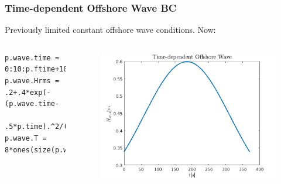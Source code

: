 \documentclass[aspectratio=169]{beamer}
\begin{document}
\begin{frame}[fragile]
  \frametitle{Time-dependent Offshore Wave BC}
Previously limited constant offshore wave conditions.  Now:
 \begin{columns}[c] %
    
 
\begin{verbatim}
p.wave.time = 0:10:p.ftime+10;
p.wave.Hrms = .2+.4*exp(-(p.wave.time-
             .5*p.time).^2/(.5*p.ftime)^2);
p.wave.T = 8*ones(size(p.wave.time));
\end{verbatim}%

    \begin{figure}
      \includegraphics[width=1\linewidth]{./waves.png}
    \end{figure}

 \end{columns}
 \end{frame}
\end{document}
